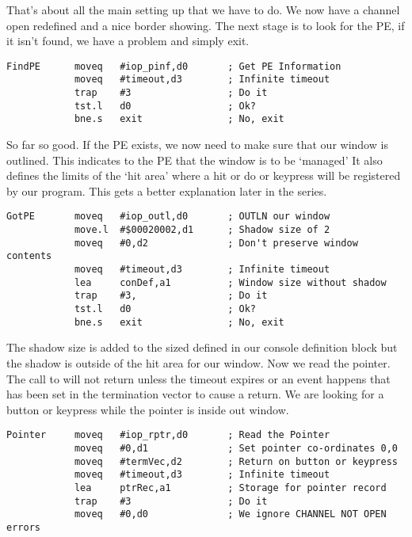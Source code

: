 That's about all the main setting up that we have to do. We now have a channel open
redefined and a nice border showing. The next stage is to look for the PE, if it isn't
found, we have a problem and simply exit.

\begin{lstlisting}[firstnumber=last,caption={Simple PE Program - Part 7}]
FindPE      moveq   #iop_pinf,d0       ; Get PE Information
            moveq   #timeout,d3        ; Infinite timeout
            trap    #3                 ; Do it
            tst.l   d0                 ; Ok?
            bne.s   exit               ; No, exit
\end{lstlisting}

So far so good. If the PE exists, we now need to make sure that our window is
outlined. This indicates to the PE that the window is to be `managed'  It also defines the
limits of the `hit area' where a hit or do or keypress will be registered by our program.
This gets a better explanation later in the series.

\begin{lstlisting}[firstnumber=last,caption={Simple PE Program - Part 8}]
GotPE       moveq   #iop_outl,d0       ; OUTLN our window
            move.l  #$00020002,d1      ; Shadow size of 2 
            moveq   #0,d2              ; Don't preserve window contents
            moveq   #timeout,d3        ; Infinite timeout
            lea     conDef,a1          ; Window size without shadow
            trap    #3,                ; Do it
            tst.l   d0                 ; Ok?
            bne.s   exit               ; No, exit
\end{lstlisting}

The shadow size is added to the sized defined in our console definition block but
the shadow is outside of the hit area for our window. Now we read the pointer. The call to
 will not return unless the timeout expires or an event happens that has been set
in the termination vector to cause a return. We are looking for a button or keypress while
the pointer is inside out window.

\begin{lstlisting}[firstnumber=last,caption={Simple PE Program - Part 9}]
Pointer     moveq   #iop_rptr,d0       ; Read the Pointer
            moveq   #0,d1              ; Set pointer co-ordinates 0,0
            moveq   #termVec,d2        ; Return on button or keypress
            moveq   #timeout,d3        ; Infinite timeout
            lea     ptrRec,a1          ; Storage for pointer record
            trap    #3                 ; Do it
            moveq   #0,d0              ; We ignore CHANNEL NOT OPEN
errors
\end{lstlisting}

